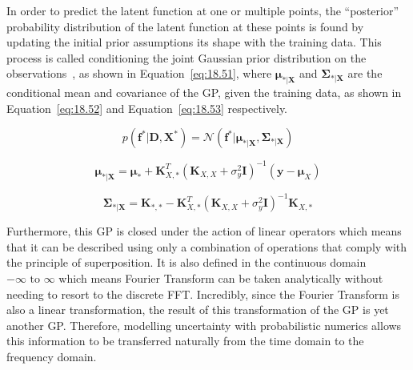 \documentclass[12pt]{article}
\begin{document}
    In order to predict the latent function at one or multiple points, the ``posterior'' probability distribution of the latent function at these points is found by updating the initial prior assumptions its shape with the training data.
    This process is called conditioning the joint Gaussian prior distribution on the observations~\cite{rasmussen2006gaussian}, as shown in Equation~\ref{eq:18.51}, where $\boldsymbol{\mu}_{*\vert \mathbf{X}}$ and $\boldsymbol{\Sigma}_{*\vert \mathbf{X}}$ are the conditional mean and covariance of the GP, given the training data, as shown in Equation~\ref{eq:18.52} and Equation~\ref{eq:18.53} respectively.

    \begin{equation}
        p(\mathbf{f}^* \vert \mathbf{D}, \mathbf{X}^*) = \mathcal{N}(\mathbf{f}^* \vert \boldsymbol{\mu}_{*\vert \mathbf{X}}, \boldsymbol{\Sigma}_{*\vert \mathbf{X}})\label{eq:18.51}
    \end{equation}

    \begin{equation}
        \boldsymbol{\mu}_{*\vert \mathbf{X}} = \boldsymbol{\mu}_* + \mathbf{K}_{X,*}^T (\mathbf{K}_{X,X} + \sigma^2_y \mathbf{I})^{-1} (\mathbf{y} - \boldsymbol{\mu}_X)\label{eq:18.52}
    \end{equation}

    \begin{equation}
        \boldsymbol{\Sigma}_{*\vert \mathbf{X}} = \mathbf{K}_{*,*} - \mathbf{K}_{X,*}^T (\mathbf{K}_{X,X} + \sigma^2_y \mathbf{I})^{-1} \mathbf{K}_{X,*}\label{eq:18.53}
    \end{equation}



    Furthermore, this GP is closed under the action of linear operators which means that it can be described using only a combination of operations that comply with the principle of superposition.
    It is also defined in the continuous domain $-\infty \text{ to } \infty$ which means Fourier Transform can be taken analytically without needing to resort to the discrete FFT\@.
    Incredibly, since the Fourier Transform is also a linear transformation, the result of this transformation of the GP is yet another GP\@.
    Therefore, modelling uncertainty with probabilistic numerics allows this information to be transferred naturally from the time domain to the frequency domain.
\end{document}
